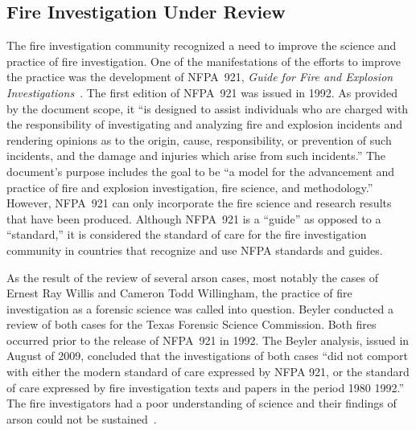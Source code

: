 \documentclass[twoside]{uocthesis}
\begin{document}
\subsection{Fire Investigation Under Review}
The fire investigation community recognized a need to improve the science and practice of fire investigation.  One of the manifestations of the efforts to improve the practice was the development of NFPA~921, {\em Guide for Fire and Explosion Investigations}~\cite{NFPA:921}.  The first edition of NFPA~921 was issued in 1992.  As provided by the document scope, it ``is designed to assist individuals who are charged with the responsibility of investigating and analyzing fire and explosion incidents and rendering opinions as to the origin, cause, responsibility, or prevention of such incidents, and the damage and injuries which arise from such incidents.'' The document’s purpose includes the goal to be ``a model for the advancement and practice of fire and explosion investigation, fire science, and methodology.'' However, NFPA~921 can only incorporate the fire science and research results that have been produced.  Although NFPA~921 is a ``guide'' as opposed to a ``standard,'' it is considered the standard of care for the fire investigation community in countries that recognize and use NFPA standards and guides.

As the result of the review of several arson cases, most notably the cases of Ernest Ray Willis and Cameron Todd Willingham, the practice of fire investigation as a forensic science was called into question.  Beyler conducted a review of both cases for the Texas Forensic Science Commission.  Both fires occurred prior to the release of NFPA~921 in 1992.  The Beyler analysis, issued in August of 2009, concluded that the investigations of both cases ``did not comport with either the modern standard of care expressed by NFPA 921, or the standard of care expressed by fire investigation texts and papers in the period 1980 {\textendash} 1992.'' The fire investigators had a poor understanding of science and their findings of arson could not be sustained~\cite{Beyler:2009}.
\end{document}
